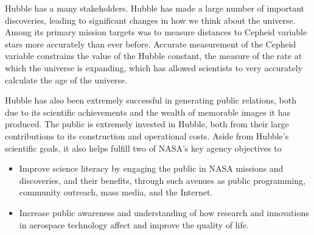 \documentclass[paper=letter, fontsize=11pt]{scrartcl} %
\numberwithin{equation}{section} %
\numberwithin{figure}{section} %
\numberwithin{table}{section} %
\begin{document}

Hubble has a many stakeholders. Hubble has made a large number of important discoveries, leading to significant changes in how we think about the universe. Among its primary mission targets was to measure distances to Cepheid variable stars more accurately than ever before. Accurate measurement of the Cepheid variable constrains the value of the Hubble constant, the measure of the rate at which the universe is expanding, which has allowed scientists to very accurately calculate the age of the universe.

Hubble has also been extremely successful in generating public relations, both due to its scientific achievements and the wealth of memorable images it has produced. The public is extremely invested in Hubble, both from their large contributions to its construction and operational costs. Aside from Hubble's scientific goals, it also helps fulfill two of NASA's key agency objectives to
\begin{itemize}
    \setlength\itemsep{0em}
    \item Improve science literacy by engaging the public in NASA missions and discoveries, and their benefits, through such avenues as public programming, community outreach, mass media, and the Internet.
    \item Increase public awareness and understanding of how research and innovations in aerospace technology affect and improve the quality of life.
\end{itemize}
\end{document}
